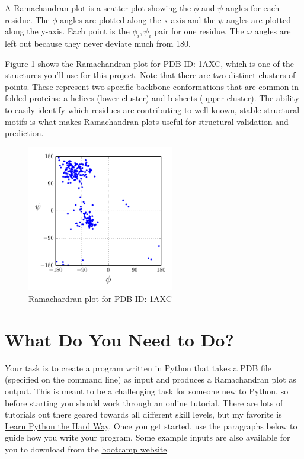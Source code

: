 \documentclass{article}
\newcommand{\ahelices}{\textgreek{a}-helices}
\newcommand{\bsheets}{\textgreek{b}-sheets}
\newcommand{\bbphi}{\ensuremath{\phi}}
\newcommand{\bbpsi}{\ensuremath{\psi}}
\newcommand{\bbomega}{\ensuremath{\omega}}
\begin{document}
A Ramachandran plot is a scatter plot showing the \bbphi{} and \bbpsi{} angles 
for each residue.  The \bbphi{} angles are plotted along the x-axis and the 
\bbpsi{} angles are plotted along the y-axis.  Each point is the $\phi_i, 
\psi_i$ pair for one residue.  The \bbomega{} angles are left out because they 
never deviate much from 180\degree.  

Figure \ref{fig:example-plot} shows the Ramachandran plot for PDB ID: 1AXC, 
which is one of the structures you'll use for this project.  Note that there 
are two distinct clusters of points.  These represent two specific backbone 
conformations that are common in folded proteins: \ahelices{} (lower cluster) 
and \bsheets{} (upper cluster).  The ability to easily identify which residues 
are contributing to well-known, stable structural motifs is what makes 
Ramachandran plots useful for structural validation and prediction. 

\begin{figure}
 \centering
 \includegraphics[width=0.57\textwidth]{example-plot}
 \caption{Ramachardran plot for PDB ID: 1AXC}
 \label{fig:example-plot}
\end{figure}

\section{What Do You Need to Do?}

Your task is to create a program written in Python that takes a PDB file 
(specified on the command line) as input and produces a Ramachandran plot as 
output.  This is meant to be a challenging task for someone new to Python, so 
before starting you should work through an online tutorial.  There are lots of 
tutorials out there geared towards all different skill levels, but my favorite 
is \href{http://learnpythonthehardway.org/book}{Learn Python the Hard Way}.  
Once you get started, use the paragraphs below to guide how you write your  
program.  Some example inputs are also available for you to download from the 
\href{https://sites.google.com/site/ipqbbootcamp2014/programming}{bootcamp 
website}.
\end{document}

